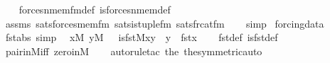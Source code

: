 \begin{isabellebody}
%
\isadelimproof
\ \ %
\endisadelimproof
%
\isatagproof
{}\isamarkupfalse%
\ forces{\isacharunderscore}{\kern0pt}nmem{\isacharunderscore}{\kern0pt}fm{\isacharunderscore}{\kern0pt}def\ is{\isacharunderscore}{\kern0pt}forces{\isacharunderscore}{\kern0pt}nmem{\isacharprime}{\kern0pt}{\isacharunderscore}{\kern0pt}def\isanewline
\ \ \isamarkupfalse%
\ assms\ sats{\isacharunderscore}{\kern0pt}forces{\isacharunderscore}{\kern0pt}mem{\isacharprime}{\kern0pt}{\isacharunderscore}{\kern0pt}fm\ sats{\isacharunderscore}{\kern0pt}is{\isacharunderscore}{\kern0pt}tuple{\isacharunderscore}{\kern0pt}fm\ sats{\isacharunderscore}{\kern0pt}frc{\isacharunderscore}{\kern0pt}at{\isacharunderscore}{\kern0pt}fm\isanewline
\ \ \isamarkupfalse%
\ simp%
\endisatagproof
{\isafoldproof}%
%
\isadelimproof
\isanewline
%
\endisadelimproof
\isanewline
{}\isamarkupfalse%
\ forcing{\isacharunderscore}{\kern0pt}data\isanewline
{}\isanewline
\isanewline
\isanewline
{}\isamarkupfalse%
\ fst{\isacharunderscore}{\kern0pt}abs\ {\isacharbrackleft}{\kern0pt}simp{\isacharbrackright}{\kern0pt}{\isacharcolon}{\kern0pt}\isanewline
\ \ {\isachardoublequoteopen}{\isasymlbrakk}x{\isasymin}M{\isacharsemicolon}{\kern0pt}\ y{\isasymin}M\ {\isasymrbrakk}\ {\isasymLongrightarrow}\ is{\isacharunderscore}{\kern0pt}fst{\isacharparenleft}{\kern0pt}{\isacharhash}{\kern0pt}{\isacharhash}{\kern0pt}M{\isacharcomma}{\kern0pt}x{\isacharcomma}{\kern0pt}y{\isacharparenright}{\kern0pt}\ {\isasymlongleftrightarrow}\ y\ {\isacharequal}{\kern0pt}\ fst{\isacharparenleft}{\kern0pt}x{\isacharparenright}{\kern0pt}{\isachardoublequoteclose}\isanewline
%
\isadelimproof
\ \ %
\endisadelimproof
%
\isatagproof
{}\isamarkupfalse%
\ fst{\isacharunderscore}{\kern0pt}def\ is{\isacharunderscore}{\kern0pt}fst{\isacharunderscore}{\kern0pt}def\ \isamarkupfalse%
\ pair{\isacharunderscore}{\kern0pt}in{\isacharunderscore}{\kern0pt}M{\isacharunderscore}{\kern0pt}iff\ zero{\isacharunderscore}{\kern0pt}in{\isacharunderscore}{\kern0pt}M\isanewline
\ \ \isamarkupfalse%
\ {\isacharparenleft}{\kern0pt}auto{\isacharsemicolon}{\kern0pt}rule{\isacharunderscore}{\kern0pt}tac\ the{\isacharunderscore}{\kern0pt}{}\ the{\isacharunderscore}{\kern0pt}{}{\isacharbrackleft}{\kern0pt}symmetric{\isacharbrackright}{\kern0pt}{\isacharcomma}{\kern0pt}auto{\isacharparenright}{\kern0pt}%
\endisatagproof
{\isafoldproof}%
%
\isadelimproof
\isanewline
%
\endisadelimproof
\isanewline
{}\isamarkupfalse%

\end{isabellebody}
